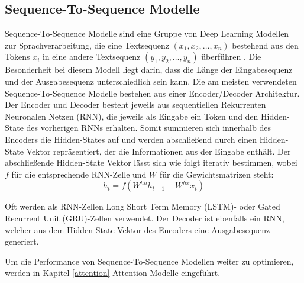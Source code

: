 \subsection{Sequence-To-Sequence Modelle}
Sequence-To-Sequence Modelle sind eine Gruppe von Deep Learning Modellen zur Sprachverarbeitung, die eine Textsequenz $(x_1,x_2,\ldots,x_n)$ bestehend aus den Tokens $x_i$ in eine andere Textsequenz $(y_1,y_2,\ldots,y_n)$ überführen \citep{DBLP:journals/corr/SutskeverVL14}.
Die Besonderheit bei diesem Modell liegt darin, dass die Länge der Eingabesequenz und der Ausgabesequenz unterschiedlich sein kann.
Die am meisten verwendeten Sequence-To-Sequence Modelle bestehen aus einer Encoder/Decoder Architektur.
Der Encoder und Decoder besteht jeweils aus sequentiellen Rekurrenten Neuronalen Netzen (RNN), die jeweils als Eingabe ein Token und den Hidden-State des vorherigen RNNs erhalten.
Somit summieren sich innerhalb des Encoders die Hidden-States auf und werden abschließend durch einen Hidden-State Vektor repräsentiert, der die Informationen aus der Eingabe enthält.
Der abschließende Hidden-State Vektor lässt sich wie folgt iterativ bestimmen, wobei $f$ für die entsprechende RNN-Zelle und $W$ für die Gewichtsmatrizen steht:
\begin{equation}
    h_t = f(W^{hh}h_{t-1}+W^{hx}x_t)
\end{equation}

Oft werden als RNN-Zellen Long Short Term Memory (LSTM)- oder Gated Recurrent Unit (GRU)-Zellen verwendet.
Der Decoder ist ebenfalls ein RNN, welcher aus dem Hidden-State Vektor des Encoders eine Ausgabesequenz generiert.

Um die Performance von Sequence-To-Sequence Modellen weiter zu optimieren, werden in Kapitel \ref{attention} Attention Modelle eingeführt.

\pagebreak
